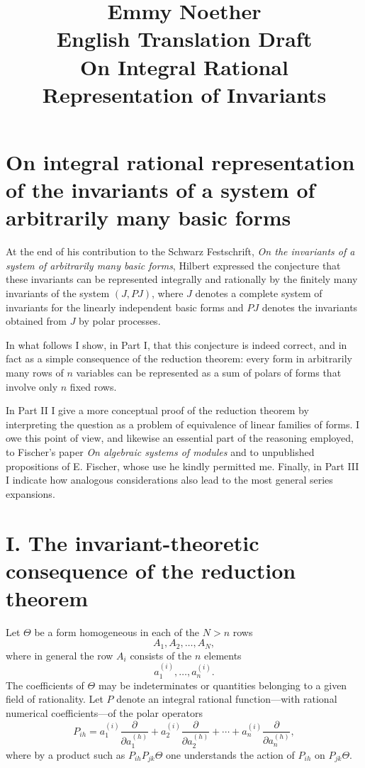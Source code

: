 \documentclass[11pt]{article}
\title{Emmy Noether\\English Translation Draft\\On Integral Rational Representation of Invariants}
\author{}
\date{}
\begin{document}
\maketitle

\section*{On integral rational representation of the invariants of a system of arbitrarily many basic forms}

At the end of his contribution to the Schwarz Festschrift, \emph{On the invariants of a system of arbitrarily many basic forms}, Hilbert expressed the conjecture that these invariants can be represented integrally and rationally by the finitely many invariants of the system \((J,PJ)\), where \(J\) denotes a complete system of invariants for the linearly independent basic forms and \(PJ\) denotes the invariants obtained from \(J\) by polar processes.

In what follows I show, in Part I, that this conjecture is indeed correct, and in fact as a simple consequence of the reduction theorem: every form in arbitrarily many rows of \(n\) variables can be represented as a sum of polars of forms that involve only \(n\) fixed rows.

In Part II I give a more conceptual proof of the reduction theorem by interpreting the question as a problem of equivalence of linear families of forms. I owe this point of view, and likewise an essential part of the reasoning employed, to Fischer's paper \emph{On algebraic systems of modules} and to unpublished propositions of E. Fischer, whose use he kindly permitted me. Finally, in Part III I indicate how analogous considerations also lead to the most general series expansions.

\section*{I. The invariant-theoretic consequence of the reduction theorem}

Let \(\Theta\) be a form homogeneous in each of the \(N>n\) rows
\[
A_1,A_2,\dots,A_N,
\]
where in general the row \(A_i\) consists of the \(n\) elements
\[
a_1^{(i)},\dots,a_n^{(i)}.
\]
The coefficients of \(\Theta\) may be indeterminates or quantities belonging to a given field of rationality. Let \(P\) denote an integral rational function---with rational numerical coefficients---of the polar operators
\[
P_{ih}
=
a_1^{(i)}\frac{\partial}{\partial a_1^{(h)}}
+
a_2^{(i)}\frac{\partial}{\partial a_2^{(h)}}
+\cdots+
a_n^{(i)}\frac{\partial}{\partial a_n^{(h)}},
\]
where by a product such as \(P_{ih}P_{jk}\Theta\) one understands the action of \(P_{ih}\) on \(P_{jk}\Theta\).
\end{document}
